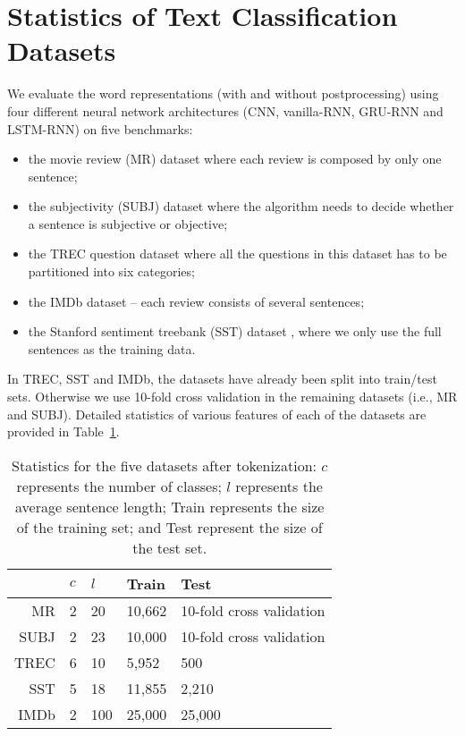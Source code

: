 \documentclass{article} \usepackage{acl2017,times}
\begin{document}
\section{Statistics of Text Classification Datasets}
\label{app:sentiment}
We evaluate the word representations (with and without postprocessing) using  four different neural network architectures (CNN, vanilla-RNN, GRU-RNN and LSTM-RNN) on  five benchmarks: 
\begin{itemize}
\item the movie review (MR) dataset \citep{pang2005seeing} where each review is composed by only one sentence; 
\item the subjectivity (SUBJ) dataset \citep{pang2004sentimental}  where the algorithm needs to decide whether a sentence is subjective or objective; 
\item  the TREC question dataset \citep{li2002learning} where all the questions in this dataset has to be partitioned into six categories; 
\item  the IMDb dataset \citep{maas2011learning} -- each review consists of several sentences; 
\item the Stanford sentiment treebank (SST) dataset \citep{socher2013reasoning}, where we only use the full sentences as the training data. 
\end{itemize}

In TREC, SST and IMDb, the datasets have already been split into train/test sets. Otherwise we use 10-fold cross validation in the remaining datasets (i.e., MR and SUBJ). Detailed statistics of various features of each of the datasets are provided in Table~\ref{tb:sentiment-analysis-dataset}.

\begin{table}[!h]
\centering
\begin{tabular}{|r|l|l|l|l|}
\hline
     & $c$ & $l$  & Train    & Test   \\ \hline
MR   & 2   & 20   & 10,662 & 10-fold cross validation     \\ \hline
SUBJ & 2   & 23   & 10,000 & 10-fold cross validation     \\ \hline
TREC & 6   & 10   & 5,952  & 500    \\ \hline
SST  & 5   & 18   & 11,855 & 2,210  \\ \hline
IMDb & 2   & 100 & 25,000 & 25,000 \\ \hline
\end{tabular}
\caption{Statistics for the five datasets after tokenization: $c$ represents the number of classes; $l$ represents the average sentence length; Train represents the size of the training set; and Test represent the size of the test set.}
\label{tb:sentiment-analysis-dataset}
\end{table}
\end{document}

